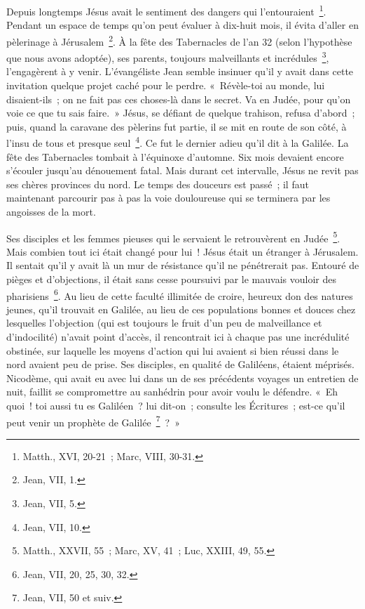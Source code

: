 \documentclass[french,twoside]{book} %
\newcommand\chaptercont{} %
\begin{document}
\chaptercont
\noindent Depuis longtemps Jésus avait le sentiment des dangers qui l’entouraient \footnote{Matth., XVI, 20-21 ; Marc, VIII, 30-31.}. Pendant un espace de temps qu’on peut évaluer à dix-huit mois, il évita d’aller en pèlerinage à Jérusalem \footnote{Jean, VII, 1.}. À la fête des Tabernacles de l’an 32 (selon l’hypothèse que nous avons adoptée), ses parents, toujours malveillants et incrédules \footnote{Jean, VII, 5.}, l’engagèrent à y venir. L’évangéliste Jean semble insinuer qu’il y avait dans cette invitation quelque projet caché pour le perdre. « Révèle-toi au monde, lui disaient-ils ; on ne fait pas ces choses-là dans le secret. Va en Judée, pour qu’on voie ce que tu sais faire. » Jésus, se défiant de quelque trahison, refusa d’abord ; puis, quand la caravane des pèlerins fut partie, il se mit en route de son côté, à l’insu de tous et presque seul \footnote{Jean, VII, 10.}. Ce fut le dernier adieu qu’il dit à la Galilée. La fête des Tabernacles tombait à l’équinoxe d’automne. Six mois devaient encore s’écouler jusqu’au dénouement fatal. Mais durant cet intervalle, Jésus ne revit pas ses chères provinces du nord. Le temps des douceurs est passé ; il faut maintenant parcourir pas à pas la voie douloureuse qui se terminera par les angoisses de la mort.\par
Ses disciples et les femmes pieuses qui le servaient le retrouvèrent en Judée \footnote{Matth., XXVII, 55 ; Marc, XV, 41 ; Luc, XXIII, 49, 55.}. Mais combien tout ici était changé pour lui ! Jésus était un étranger à Jérusalem. Il sentait qu’il y avait là un mur de résistance qu’il ne pénétrerait pas. Entouré de pièges et d’objections, il était sans cesse poursuivi par le mauvais vouloir des pharisiens \footnote{Jean, VII, 20, 25, 30, 32.}. Au lieu de cette faculté illimitée de croire, heureux don des natures jeunes, qu’il trouvait en Galilée, au lieu de ces populations bonnes et douces chez lesquelles l’objection (qui est toujours le fruit d’un peu de malveillance et d’indocilité) n’avait point d’accès, il rencontrait ici à chaque pas une incrédulité obstinée, sur laquelle les moyens d’action qui lui avaient si bien réussi dans le nord avaient peu de prise. Ses disciples, en qualité de Galiléens, étaient méprisés. Nicodème, qui avait eu avec lui dans un de ses précédents voyages un entretien de nuit, faillit se compromettre au sanhédrin pour avoir voulu le défendre. « Eh quoi ! toi aussi tu es Galiléen ? lui dit-on ; consulte les Écritures ; est-ce qu’il peut venir un prophète de Galilée \footnote{Jean, VII, 50 et suiv.} ? »\par
\end{document}
